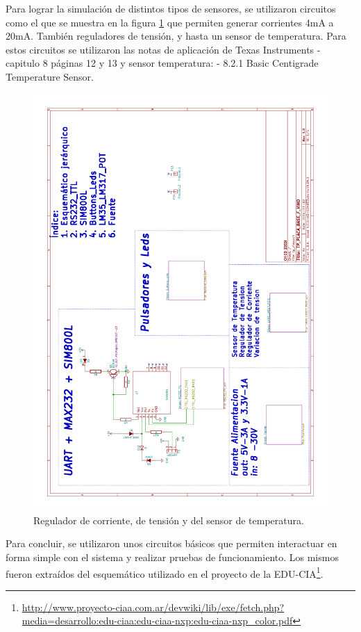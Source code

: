Para lograr la simulación de distintos tipos de sensores, se utilizaron circuitos como el que se muestra en la figura \ref{fig:temp_tens}  que permiten generar corrientes 4mA a 20mA. También reguladores de tensión, y hasta un sensor de temperatura. Para estos circuitos se utilizaron las notas de aplicación de Texas Instruments\citep{Texas:LM317} - capitulo 8 páginas 12 y 13 y sensor temperatura: \citep{Texas:LM35} - 8.2.1 Basic Centigrade Temperature Sensor. 
\begin{figure}[!htb]
  \centering
  \includegraphics[page=4,scale=0.3,angle=270]{./Figures/schematic.pdf}
  \caption{Regulador de corriente, de tensión y del sensor de temperatura.}
  \label{fig:temp_tens}
\end{figure}

Para concluir, se utilizaron unos circuitos básicos que permiten interactuar en forma simple con el sistema y realizar pruebas de funcionamiento. Los mismos fueron extraídos del esquemático utilizado en el proyecto de la EDU-CIA\footnote{\url{http://www.proyecto-ciaa.com.ar/devwiki/lib/exe/fetch.php?media=desarrollo:edu-ciaa:edu-ciaa-nxp:edu-ciaa-nxp\_color.pdf}}.


